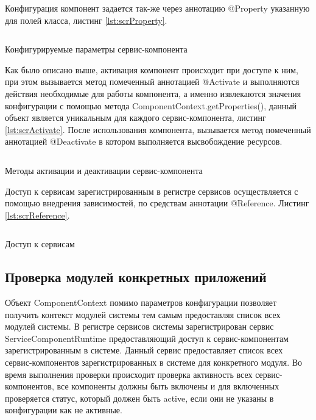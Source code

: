 Конфигурация компонент задается так-же через аннотацию @Property указанную для полей класса, листинг \ref{lst:scrProperty}. 

\begin{listing}[H]
\inputminted[linenos,frame=single]{java}{inc/src/scrProperty}
\caption{Конфигурируемые параметры сервис-компонента} 
\label{lst:scrProperty}
\end{listing}

Как было описано выше, активация компонент происходит при доступе к ним, при этом вызывается метод помеченный аннотацией @Activate и выполняются действия необходимые для работы компонента, а именно извлекаются значения конфигурации с помощью метода ComponentContext.getProperties(), данный объект является уникальным для каждого сервис-компонента, листинг \ref{lst:scrActivate}. После использования компонента, вызывается метод помеченный аннотацией @Deactivate в котором выполняется высвобождение ресурсов.

\begin{listing}[H]
\inputminted[linenos,frame=single]{java}{inc/src/scrActivate}
\caption{Методы активации и деактивации сервис-компонента} 
\label{lst:scrActivate}
\end{listing}

Доступ к сервисам зарегистрированным в регистре сервисов осуществляется с помощью внедрения зависимостей, по средствам аннотации @Reference. Листинг \ref{lst:scrReference}.

\begin{listing}[H]
\inputminted[linenos,frame=single]{java}{inc/src/scrReference}
\caption{Доступ к сервисам} 
\label{lst:scrReference}
\end{listing}

\subsection{Проверка модулей конкретных приложений}
Объект ComponentContext помимо параметров конфигурации позволяет получить контекст модулей системы тем самым предоставляя список всех модулей системы. В регистре сервисов системы зарегистрирован сервис ServiceComponentRuntime предоставляющий доступ к сервис-компонентам зарегистрированным в системе. Данный сервис предоставляет список всех сервис-компонентов зарегистрированных в системе для конкретного модуля. Во время выполнения проверки происходит проверка активность всех сервис-компонентов, все компоненты должны быть включены и для включенных проверяется статус, который должен быть active, если они не указаны в конфигурации как не активные.

